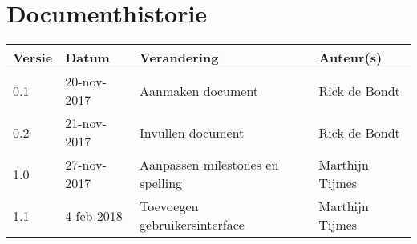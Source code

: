 \section{Documenthistorie}

\begin{tabularx}{\textwidth}{| l | l | X | l |}
    \hline
    \textbf{Versie} & \textbf{Datum} & \textbf{Verandering} & \textbf{Auteur(s)} \\ \hline
    0.1 & 20-nov-2017 & Aanmaken document & Rick de Bondt \\ \hline
    0.2 & 21-nov-2017 & Invullen document & Rick de Bondt \\ \hline
    1.0 & 27-nov-2017 & Aanpassen milestones en spelling & Marthijn Tijmes \\ \hline
    1.1 & 4-feb-2018 & Toevoegen gebruikersinterface & Marthijn Tijmes \\ \hline
\end{tabularx}
